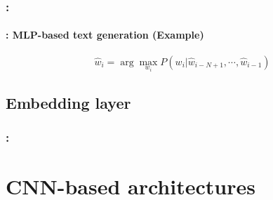 \documentclass[xcolor=table]{beamer}
\begin{document}
\begin{frame}
	\frametitle{\insertshortsubtitle: \insertsection}
	\framesubtitle{\insertsubsection: MLP-based text generation (Example)}
	
	\[\hat{w}_i = \arg\max\limits_{w_i} P(w_i | \hat{w}_{i-N+1}, \cdots, \hat{w}_{i-1})\]
	
	\begin{center}
	\end{center}
	
\end{frame}

\subsection{Embedding layer}

\begin{frame}
	\frametitle{\insertshortsubtitle: \insertsection}
	\framesubtitle{\insertsubsection}
	
	
	
\end{frame}


\section{CNN-based architectures}
\end{document}
